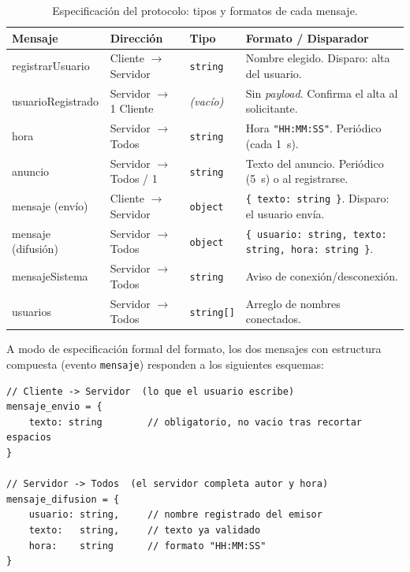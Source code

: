 \documentclass[12pt,a4paper]{article}
\begin{document}
\begin{table}[H]
\centering
\caption{Especificación del protocolo: tipos y formatos de cada mensaje.}
\label{tab:protocolo}
\renewcommand{\arraystretch}{1.35}
\begin{tabular}{@{}>{\ttfamily\raggedright\arraybackslash}p{2.6cm} >{\raggedright\arraybackslash}p{2.5cm} >{\raggedright\arraybackslash}p{2.1cm} >{\raggedright\arraybackslash}p{5.3cm}@{}}
\toprule
\textbf{\normalfont Mensaje} & \textbf{Dirección} & \textbf{Tipo} & \textbf{Formato / Disparador} \\
\midrule
registrarUsuario & Cliente $\rightarrow$ Servidor & \texttt{string} & Nombre elegido. Disparo: alta del usuario. \\
usuarioRegistrado & Servidor $\rightarrow$ 1 Cliente & \textit{(vacío)} & Sin \textit{payload}. Confirma el alta al solicitante. \\
hora & Servidor $\rightarrow$ Todos & \texttt{string} & Hora \texttt{"HH:MM:SS"}. Periódico (cada 1~s). \\
anuncio & Servidor $\rightarrow$ Todos / 1 & \texttt{string} & Texto del anuncio. Periódico (5~s) o al registrarse. \\
mensaje (envío) & Cliente $\rightarrow$ Servidor & \texttt{object} & \texttt{\{ texto: string \}}. Disparo: el usuario envía. \\
mensaje (difusión) & Servidor $\rightarrow$ Todos & \texttt{object} & \texttt{\{ usuario: string, texto: string, hora: string \}}. \\
mensajeSistema & Servidor $\rightarrow$ Todos & \texttt{string} & Aviso de conexión/desconexión. \\
usuarios & Servidor $\rightarrow$ Todos & \texttt{string[]} & Arreglo de nombres conectados. \\
\bottomrule
\end{tabular}
\end{table}

A modo de especificación formal del formato, los dos mensajes con estructura compuesta (evento \texttt{mensaje}) responden a los siguientes esquemas:

\begin{lstlisting}[caption={Esquemas del \textit{payload} del evento \texttt{mensaje} (envío y difusión).}, label={alg:esquema}]
// Cliente -> Servidor  (lo que el usuario escribe)
mensaje_envio = {
    texto: string        // obligatorio, no vacio tras recortar espacios
}

// Servidor -> Todos  (el servidor completa autor y hora)
mensaje_difusion = {
    usuario: string,     // nombre registrado del emisor
    texto:   string,     // texto ya validado
    hora:    string      // formato "HH:MM:SS"
}
\end{lstlisting}
\end{document}

